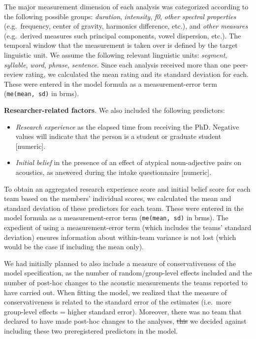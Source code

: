 \documentclass[Review,times,sageh]{sagej}
\providecommand{\tightlist}{\setlength{\itemsep}{0pt}\setlength{\parskip}{0pt}}
\providecommand{\DIFaddtex}[1]{{\protect\color{blue}\uwave{#1}}} %
\providecommand{\DIFdeltex}[1]{{\protect\color{red}\sout{#1}}}                      %
\providecommand{\DIFaddbegin}{} %
\providecommand{\DIFaddend}{} %
\providecommand{\DIFdelbegin}{} %
\providecommand{\DIFdelend}{} %
\providecommand{\DIFadd}[1]{\texorpdfstring{\DIFaddtex{#1}}{#1}} %
\providecommand{\DIFdel}[1]{\texorpdfstring{\DIFdeltex{#1}}{}} %
\begin{document}
The major measurement dimension of each analysis was categorized according to the following possible groups: \emph{duration}, \emph{intensity}, \emph{f0}, \emph{other spectral properties} (e.g.~frequency, center of gravity, harmonics difference, etc.), and \emph{other measures} (e.g.~derived measures such principal components, vowel dispersion, etc.).
The temporal window that the measurement is taken over is defined by the target linguistic unit.
We assume the following relevant linguistic units: \emph{segment}, \emph{syllable}, \emph{word}, \emph{phrase}, \emph{sentence}.
Since each analysis received more than one peer-review rating, we calculated the mean rating and its standard deviation for each.
These were entered in the model formula as a measurement-error term (\texttt{me(mean,\ sd)} in brms).

\textbf{Researcher-related factors}. We also included the following predictors:

\begin{itemize}
\tightlist
\item
  \emph{Research experience} as the elapsed time from receiving the PhD. Negative values will indicate that the person is a student or graduate student {[}numeric{]}.
\item
  \emph{Initial belief} in the presence of an effect of atypical noun-adjective pairs on acoustics, as answered during the intake questionnaire {[}numeric{]}.
\end{itemize}

To obtain an aggregated research experience score and initial belief score for each team based on the members' individual scores, we calculated the mean and standard deviation of these predictors for each team.
These were entered in the model formula as a measurement-error term (\texttt{me(mean,\ sd)} in brms).
The expedient of using a measurement-error term (which includes the teams' standard deviation) ensures information about within-team variance is not lost (which would be the case if including the mean only).

We had initially planned to also include a measure of conservativeness of the model specification, as the number of random/group-level effects included and the number of post-hoc changes to the acoustic measurements the teams reported to have carried out.
When fitting the model, we realized that the measure of conservativeness is related to the standard error of the estimates (i.e.~more group-level effects = higher standard error).
Moreover, there was no team that declared to have made post-hoc changes to the analyses, \DIFdelbegin \DIFdel{this }\DIFdelend \DIFaddbegin \DIFadd{thus }\DIFaddend we decided against including these two preregistered predictors in the model.
\end{document}
